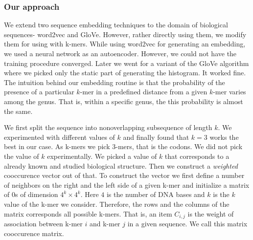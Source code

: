 \documentclass[oneside, twocolumn, a4paper, 10pt]{IEEEtran}
\begin{document}
\subsubsection{Our approach}
We extend two sequence embedding techniques to the domain of biological sequences- word2vec and GloVe. However, rather directly using them, we modify them for using with k-mers. While using word2vec for generating an embedding, we used a neural network as an autoencoder. However, we could not have the training procedure converged. Later we went for a variant of the GloVe algorithm where we picked only the static part of generating the histogram. It worked fine. The intuition behind our embedding routine is that the probability of the presence of a particular $k$-mer in a predefined distance from a given $k$-mer varies among the genus. That is, within a specific genus, the this probability is almost the same.\\
\par
We first split the sequence into nonoverlapping subsequence of length $k$. We experimented with different values of $k$ and finally found that $k = 3$ works the best in our case. As k-mers we pick 3-mers, that is the codons. We did not pick the value of $k$ experimentally. We picked a value of $k$ that corresponds to a already known and studied biological structure. Then we construct a \textit{weighted} cooccurence vector out of that. To construct the vector we first define a number of neighbors on the right and the left side of a given k-mer and initialize a matrix of $0$s of dimension $4^k \times 4^k$. Here $4$ is the number of DNA bases and $k$ is the $k$ value of the k-mer we consider. Therefore, the rows and the columns of the matrix corresponds all possible k-mers. That is, an item $C_{i,j}$ is the weight of association between k-mer $i$ and k-mer $j$ in a given sequence. We call this matrix cooccurence matrix.\\
\par
\end{document}
